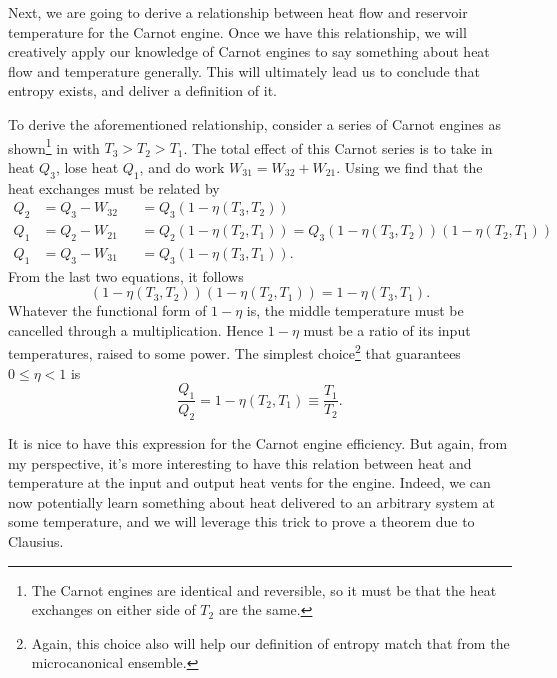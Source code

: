 Next, we are going to derive a relationship between heat flow and reservoir
temperature for the Carnot engine. Once we have this relationship, we will
creatively apply our knowledge of Carnot engines to say something about heat
flow and temperature generally. This will ultimately lead us to conclude that
entropy exists, and deliver a definition of it.

To derive the aforementioned relationship, consider a series of Carnot engines
as shown\footnote{The Carnot engines are identical and reversible, so it
must be that the heat exchanges on either side of $T_2$ are the same.}
in  with $T_3>T_2>T_1$. The total effect of this
Carnot series is to take in heat $Q_3$, lose heat $Q_1$, and do work
$W_{31}=W_{32}+W_{21}.$ Using  
we find that the heat exchanges must be related by
\begin{equation}\begin{aligned}
  Q_2 &= Q_3 - W_{32} &&= Q_3\left(1-\eta(T_3,T_2)\right) \\
  Q_1 &= Q_2 - W_{21} &&= Q_2\left(1-\eta(T_2,T_1)\right) 
                  = Q_3\left(1-\eta(T_3,T_2)\right)\left(1-\eta(T_2,T_1)\right) \\
  Q_1 &= Q_3 - W_{31} &&= Q_3\left(1-\eta(T_3,T_1)\right).
\end{aligned}\end{equation}
From the last two equations, it follows
\begin{equation}
\left(1-\eta(T_3,T_2)\right)\left(1-\eta(T_2,T_1)\right) =
1-\eta(T_3,T_1).
\end{equation}
Whatever the functional form of $1-\eta$ is, the middle temperature must be
cancelled through a multiplication. Hence $1-\eta$ must be a ratio of its input
temperatures, raised to some power. The simplest choice\footnote{Again, this
choice also will help our definition of entropy match that from the
microcanonical ensemble.} that guarantees $0\leq\eta<1$ is
\begin{equation}\label{eq:carnotEfficiency}
  \frac{Q_1}{Q_2}=1-\eta(T_2,T_1)\equiv\frac{T_1}{T_2}.
\end{equation}

It is nice to have this expression for the Carnot engine efficiency.
But again, from my perspective, it's more interesting to have this relation between
heat and temperature at the input and output heat vents for the engine.
Indeed, we can now potentially learn something about heat delivered
to an arbitrary system at some temperature, and we will leverage this trick to
prove a theorem due to Clausius.

